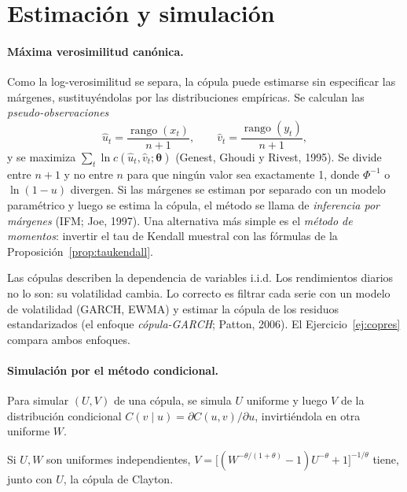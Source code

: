 \section{Estimación y simulación}

\paragraph{Máxima verosimilitud canónica.} Como la log-verosimilitud se separa, la cópula puede estimarse sin especificar
las márgenes, sustituyéndolas por las distribuciones empíricas. Se calculan las \emph{pseudo-observaciones}
\[
  \hat u_t=\frac{\operatorname{rango}(x_t)}{n+1},\qquad \hat v_t=\frac{\operatorname{rango}(y_t)}{n+1},
\]
y se maximiza $\sum_t\ln c(\hat u_t,\hat v_t;\boldsymbol\theta)$ (Genest, Ghoudi y Rivest, 1995). Se divide entre $n+1$ y no
entre $n$ para que ningún valor sea exactamente 1, donde $\Phi^{-1}$ o $\ln(1-u)$ divergen. Si las márgenes se estiman por
separado con un modelo paramétrico y luego se estima la cópula, el método se llama de \emph{inferencia por márgenes}
(IFM; Joe, 1997). Una alternativa más simple es el \emph{método de momentos}: invertir el tau de Kendall muestral con las
fórmulas de la Proposición~\ref{prop:taukendall}.

\begin{observacion}
Las cópulas describen la dependencia de variables i.i.d. Los rendimientos diarios no lo son: su volatilidad cambia. Lo
correcto es filtrar cada serie con un modelo de volatilidad (GARCH, EWMA) y estimar la cópula de los residuos
estandarizados (el enfoque \emph{cópula-GARCH}; Patton, 2006). El Ejercicio~\ref{ej:copres} compara ambos enfoques.
\end{observacion}

\paragraph{Simulación por el método condicional.} Para simular $(U,V)$ de una cópula, se simula $U$ uniforme y luego $V$ de
la distribución condicional $C(v\mid u)=\partial C(u,v)/\partial u$, invirtiéndola en otra uniforme $W$.

\begin{proposicion}\label{prop:simclayton}
Si $U,W$ son uniformes independientes, $V=\bigl[(W^{-\theta/(1+\theta)}-1)U^{-\theta}+1\bigr]^{-1/\theta}$ tiene, junto con $U$, la
cópula de Clayton.
\end{proposicion}

